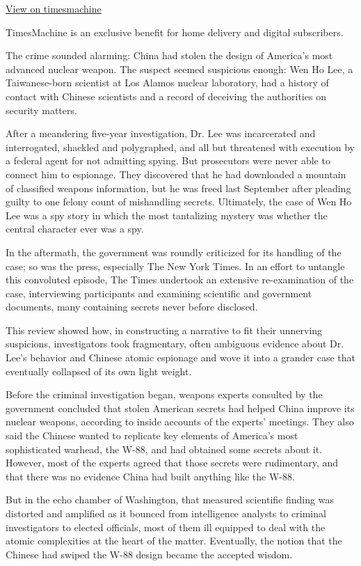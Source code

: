 \href{http://timesmachine.nytimes.com/timesmachine/2001/02/04/760501.html}{View
on timesmachine}

TimesMachine is an exclusive benefit for home delivery and digital
subscribers.

The crime sounded alarming: China had stolen the design of America's
most advanced nuclear weapon. The suspect seemed suspicious enough: Wen
Ho Lee, a Taiwanese-born scientist at Los Alamos nuclear laboratory, had
a history of contact with Chinese scientists and a record of deceiving
the authorities on security matters.

After a meandering five-year investigation, Dr. Lee was incarcerated and
interrogated, shackled and polygraphed, and all but threatened with
execution by a federal agent for not admitting spying. But prosecutors
were never able to connect him to espionage. They discovered that he had
downloaded a mountain of classified weapons information, but he was
freed last September after pleading guilty to one felony count of
mishandling secrets. Ultimately, the case of Wen Ho Lee was a spy story
in which the most tantalizing mystery was whether the central character
ever was a spy.

In the aftermath, the government was roundly criticized for its handling
of the case; so was the press, especially The New York Times. In an
effort to untangle this convoluted episode, The Times undertook an
extensive re-examination of the case, interviewing participants and
examining scientific and government documents, many containing secrets
never before disclosed.

This review showed how, in constructing a narrative to fit their
unnerving suspicions, investigators took fragmentary, often ambiguous
evidence about Dr. Lee's behavior and Chinese atomic espionage and wove
it into a grander case that eventually collapsed of its own light
weight.

Before the criminal investigation began, weapons experts consulted by
the government concluded that stolen American secrets had helped China
improve its nuclear weapons, according to inside accounts of the
experts' meetings. They also said the Chinese wanted to replicate key
elements of America's most sophisticated warhead, the W-88, and had
obtained some secrets about it. However, most of the experts agreed that
those secrets were rudimentary, and that there was no evidence China had
built anything like the W-88.

But in the echo chamber of Washington, that measured scientific finding
was distorted and amplified as it bounced from intelligence analysts to
criminal investigators to elected officials, most of them ill equipped
to deal with the atomic complexities at the heart of the matter.
Eventually, the notion that the Chinese had swiped the W-88 design
became the accepted wisdom.

